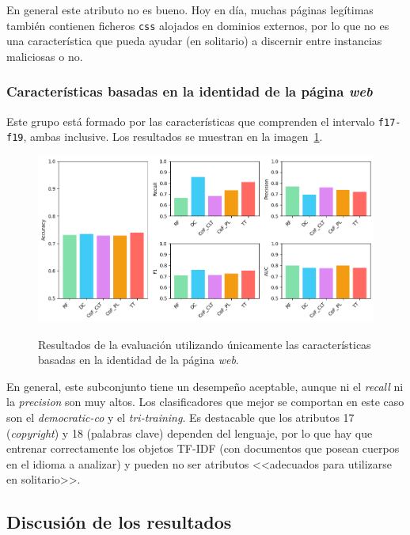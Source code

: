 En general este atributo no es bueno. Hoy en día, muchas páginas legítimas también contienen ficheros \texttt{css} alojados en dominios externos, por lo que no es una característica que pueda ayudar (en solitario) a discernir entre instancias maliciosas o no.

\subsubsection{Características basadas en la identidad de la página \textit{web}}
Este grupo está formado por las características que comprenden el intervalo \texttt{f17-f19}, ambas inclusive. Los resultados se muestran en la imagen~\ref{gr:ph-f17f19_small}.

\begin{figure}[h]
	\caption[\textit{Phishing}: detección (\texttt{f17-f19})]{Resultados de la evaluación utilizando únicamente las características basadas en la identidad de la página \textit{web}.}
	\centering
	\includegraphics[width=\textwidth]{../img/memoria/5_phishing/f17f19_big}
	\label{gr:ph-f17f19_small}
\end{figure}

En general, este subconjunto tiene un desempeño aceptable, aunque ni el \textit{recall} ni la \textit{precision} son muy altos. Los clasificadores que mejor se comportan en este caso son el \textit{democratic-co} y el \textit{tri-training}. Es destacable que los atributos 17 (\textit{copyright}) y 18 (palabras clave) dependen del lenguaje, por lo que hay que entrenar correctamente los objetos TF-IDF (con documentos que posean cuerpos en el idioma a analizar) y pueden no ser atributos <<adecuados para utilizarse en solitario>>.


\subsection{Discusión de los resultados}


